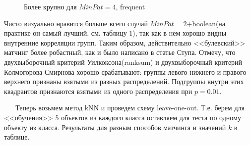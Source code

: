 \documentclass[12pt]{report}
\begin{document}
\begin{figure}[h]
\noindent{}
\caption{ Более крупно для $MinPat=4$, frequent}
\end{figure}

Чисто визуально нравится больше всего случай $MinPat=2$+boolean(на практике он самый лучший, см. таблицу 1), так как в нем хорошо видны внутренние корреляции 
групп. Таким образом, действительно <<булевский>> матчинг более робастный, как и было написано в статье Ступа.
Отмечу, что двухвыборочный критерий Уилкоксона(ranksum) и двухвыборочный критерий Колмогорова Смирнова
хорошо срабатывают: группы левого нижнего и правого верхнего признаны взятыми из разных распределений. 
Подгруппы внутри этих квадрантов признаются взятыми из одного распределения при $p=0.01$.

\newpage~
\newpage~
\newpage
Теперь возьмем метод kNN и проведем схему leave-one-out. Т.е. берем для <<обучения>> 5 объектов из каждого класса
оставляем для теста по одному объекту из класса. Результаты для разным способов матчинга и значений $k$ в таблице.
\begin{table}
\caption{Процент правильных ответов классификации. Первые 4 колонки 
соответствуют частотному матчингу паттернов соответствующей минимальной длины(подсчет вхождений).
Вторые 4 колонки 
соответствуют булевскому матчингу паттернов соответствующей минимальной длины(подсчет фактов вхождения). Р-Паттерны}
\end{table}
\end{document}
